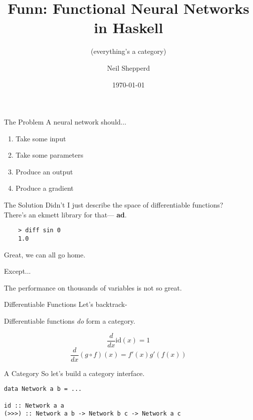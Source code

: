 \documentclass[10pt]{beamer}
\title{Funn: Functional Neural Networks in Haskell}
\subtitle{(everything's a category)}
\date{\today}
\author{Neil Shepperd}
\begin{document}
\maketitle


\begin{frame}{The Problem}
  A neural network should...
  \pause
  \begin{enumerate}
  \item Take some input \pause
  \item Take some parameters \pause
  \item Produce an output \pause
  \item Produce a gradient
  \end{enumerate}
\end{frame}

\begin{frame}[fragile]{The Solution}
  Didn't I just describe the space of differentiable functions? \\
  There's an ekmett library for that\texttrademark \pause --- \textbf{ad}.

  \begin{verbatim}
    > diff sin 0
    1.0
  \end{verbatim}

  Great, we can all go home.

  Except...
  \pause

  The performance on thousands of variables is not so great.
\end{frame}

\begin{frame}{Differentiable Functions}
  Let's backtrack-

  Differentiable functions \emph{do} form a category.

  \[ \frac{d}{dx} \text{id}(x) = 1 \]
  \[ \frac{d}{dx} (g \circ f)(x) = f'(x) g'(f(x)) \]
\end{frame}

\begin{frame}[fragile]{A Category}
  So let's build a category interface.

  \begin{verbatim}
data Network a b = ...

id :: Network a a
(>>>) :: Network a b -> Network b c -> Network a c
  \end{verbatim}
\end{frame}
\end{document}
